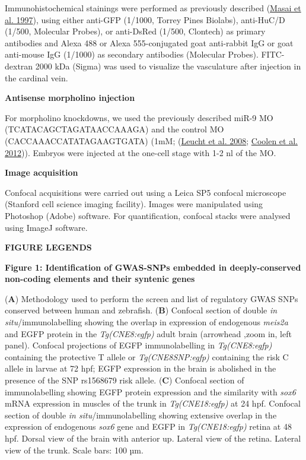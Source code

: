 \documentclass[]{article}
\begin{document}
Immunohistochemical stainings were performed as previously described
(\protect\hyperlink{_ENREF_18}{Masai et al. 1997}), using either
anti-GFP (1/1000, Torrey Pines Biolabs), anti-HuC/D (1/500, Molecular
Probes), or anti-DsRed (1/500, Clontech) as primary antibodies and Alexa
488 or Alexa 555-conjugated goat anti-rabbit IgG or goat anti-mouse IgG
(1/1000) as secondary antibodies (Molecular Probes). FITC-dextran 2000
kDa (Sigma) was used to visualize the vasculature after injection in the
cardinal vein.

\textbf{Antisense morpholino injection }

For morpholino knockdowns, we used the previously described miR-9 MO
(TCATACAGCTAGATAACCAAAGA) and the control MO (CACCAAACCATATAGAAGTGATA)
(1mM; (\protect\hyperlink{_ENREF_16}{Leucht et al. 2008};
\protect\hyperlink{_ENREF_5}{Coolen et al. 2012})). Embryos were
injected at the one-cell stage with 1-2 nl of the MO.

\textbf{Image acquisition}

Confocal acquisitions were carried out using a Leica SP5 confocal
microscope (Stanford cell science imaging facility). Images were
manipulated using Photoshop (Adobe) software. For quantification,
confocal stacks were analysed using ImageJ software.

\textbf{FIGURE LEGENDS}

\textbf{Figure 1: Identification of GWAS-SNPs embedded in
deeply-conserved non-coding elements and their syntenic genes}

(\textbf{A}) Methodology used to perform the screen and list of
regulatory GWAS SNPs conserved between human and zebrafish. (\textbf{B})
Confocal section of double \emph{in situ}/immunolabelling showing the
overlap in expression of endogenous \emph{meis2a} and EGFP protein in
the \emph{Tg(CNE8:egfp)} adult brain (arrowhead ,zoom in, left panel).
Confocal projections of EGFP immunolabelling in \emph{Tg(CNE8:egfp)}
containing the protective T allele or \emph{Tg(CNE8SNP:egfp)} containing
the risk C allele in larvae at 72 hpf; EGFP expression in the brain is
abolished in the presence of the SNP rs1568679 risk allele. (\textbf{C})
Confocal section of immunolabelling showing EGFP protein expression and
the similarity with \emph{sox6} mRNA expression in muscles of the trunk
in \emph{Tg(CNE18:egfp)} at 24 hpf. Confocal section of double \emph{in
situ}/immunolabelling showing extensive overlap in the expression of
endogenous \emph{sox6} gene and EGFP in \emph{Tg(CNE18:egfp)} retina at
48 hpf. Dorsal view of the brain with anterior up. Lateral view of the
retina. Lateral view of the trunk. Scale bars: 100 µm.
\end{document}
